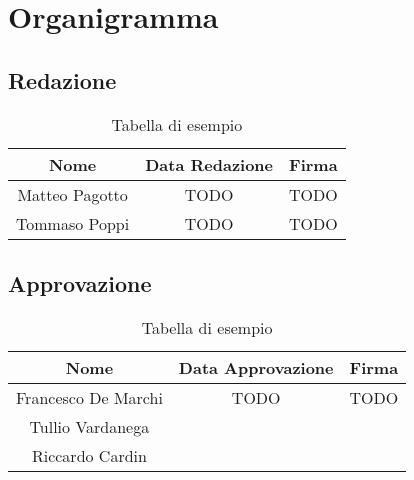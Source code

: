 \section{Organigramma}

\subsection{Redazione}

\renewcommand{\arraystretch}{1}
	\begin{table}[H]
		\begin{center}
			\setlength{\aboverulesep}{0pt}
			\setlength{\belowrulesep}{0pt}
			\setlength{\extrarowheight}{.75ex}
			\begin{tabular}{ c c c }
				\rowcolor{AzzuroGruppo!30} 
				\textbf{Nome} & \textbf{Data Redazione} & \textbf{Firma} \\
				\toprule
				Matteo Pagotto & TODO & TODO \\
                Tommaso Poppi & TODO & TODO \\
				\bottomrule
			\end{tabular}
			\caption{Tabella di esempio}
		\end{center}
	\end{table}

\subsection{Approvazione}

\renewcommand{\arraystretch}{1}
	\begin{table}[H]
		\begin{center}
			\setlength{\aboverulesep}{0pt}
			\setlength{\belowrulesep}{0pt}
			\setlength{\extrarowheight}{.75ex}
			\begin{tabular}{ c c c}
				\rowcolor{AzzuroGruppo!30} 
				\textbf{Nome} & \textbf{Data Approvazione} & \textbf{Firma} \\
				\toprule
				Francesco De Marchi & TODO & TODO \\
                Tullio Vardanega & & \\
                Riccardo Cardin & & \\
				\bottomrule
			\end{tabular}
			\caption{Tabella di esempio}
		\end{center}
    \end{table}

